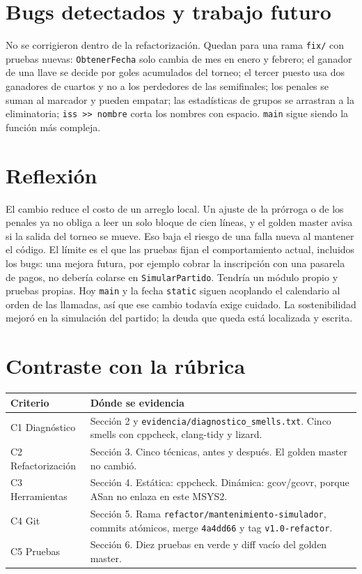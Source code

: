 \documentclass[10pt,a4paper]{article}
\begin{document}
\section{Bugs detectados y trabajo futuro}
No se corrigieron dentro de la refactorizaci\'on. Quedan para una rama \texttt{fix/} con pruebas nuevas: \texttt{ObtenerFecha} solo cambia de mes en enero y febrero; el ganador de una llave se decide por goles acumulados del torneo; el tercer puesto usa dos ganadores de cuartos y no a los perdedores de las semifinales; los penales se suman al marcador y pueden empatar; las estad\'isticas de grupos se arrastran a la eliminatoria; \texttt{iss >> nombre} corta los nombres con espacio. \texttt{main} sigue siendo la funci\'on m\'as compleja.

\section{Reflexi\'on}
El cambio reduce el costo de un arreglo local. Un ajuste de la pr\'orroga o de los penales ya no obliga a leer un solo bloque de cien l\'ineas, y el golden master avisa si la salida del torneo se mueve. Eso baja el riesgo de una falla nueva al mantener el c\'odigo. El l\'imite es el que las pruebas fijan el comportamiento actual, incluidos los bugs: una mejora futura, por ejemplo cobrar la inscripci\'on con una pasarela de pagos, no deber\'ia colarse en \texttt{SimularPartido}. Tendr\'ia un m\'odulo propio y pruebas propias. Hoy \texttt{main} y la fecha \texttt{static} siguen acoplando el calendario al orden de las llamadas, as\'i que ese cambio todav\'ia exige cuidado. La sostenibilidad mejor\'o en la simulaci\'on del partido; la deuda que queda est\'a localizada y escrita.

\section{Contraste con la r\'ubrica}
\begin{center}
\scriptsize
\begin{tabular}{|p{2.2cm}|p{12.4cm}|}
\hline
Criterio & D\'onde se evidencia \\
\hline
C1 Diagn\'ostico & Secci\'on 2 y \texttt{evidencia/diagnostico\_smells.txt}. Cinco smells con cppcheck, clang-tidy y lizard. \\
\hline
C2 Refactorizaci\'on & Secci\'on 3. Cinco t\'ecnicas, antes y despu\'es. El golden master no cambi\'o. \\
\hline
C3 Herramientas & Secci\'on 4. Est\'atica: cppcheck. Din\'amica: gcov/gcovr, porque ASan no enlaza en este MSYS2. \\
\hline
C4 Git & Secci\'on 5. Rama \texttt{refactor/mantenimiento-simulador}, commits at\'omicos, merge \texttt{4a4dd66} y tag \texttt{v1.0-refactor}. \\
\hline
C5 Pruebas & Secci\'on 6. Diez pruebas en verde y diff vac\'io del golden master. \\
\hline
\end{tabular}
\end{center}
\end{document}
